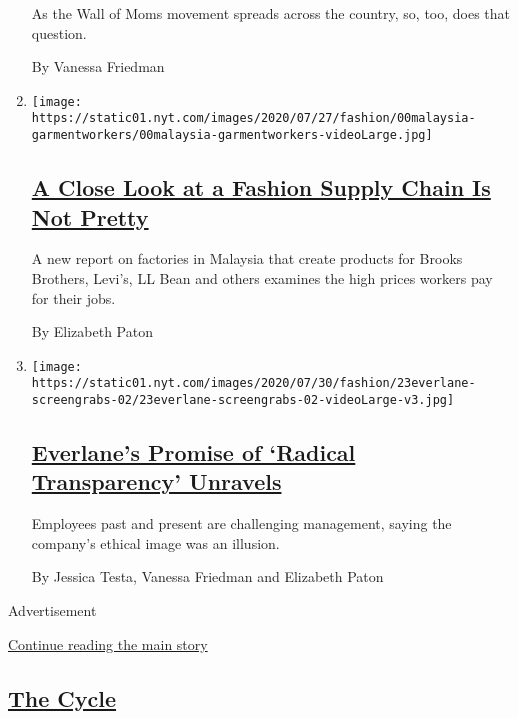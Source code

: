 \begin{enumerate}
  As the Wall of Moms movement spreads across the country, so, too, does
  that question.

  By Vanessa Friedman
\item
  \texttt{[image: https://static01.nyt.com/images/2020/07/27/fashion/00malaysia-garmentworkers/00malaysia-garmentworkers-videoLarge.jpg]}

  \hypertarget{a-close-look-at-a-fashion-supply-chain-is-not-pretty}{%
  \subsection{\texorpdfstring{\href{/2020/07/28/style/malaysia-forced-labor-garment-workers.html}{A
  Close Look at a Fashion Supply Chain Is Not
  Pretty}}{A Close Look at a Fashion Supply Chain Is Not Pretty}}\label{a-close-look-at-a-fashion-supply-chain-is-not-pretty}}

  A new report on factories in Malaysia that create products for Brooks
  Brothers, Levi's, LL Bean and others examines the high prices workers
  pay for their jobs.

  By Elizabeth Paton
\item
  \texttt{[image: https://static01.nyt.com/images/2020/07/30/fashion/23everlane-screengrabs-02/23everlane-screengrabs-02-videoLarge-v3.jpg]}

  \hypertarget{everlanes-promise-of-radical-transparency-unravels}{%
  \subsection{\texorpdfstring{\href{/2020/07/26/fashion/everlane-employees-ethical-clothing.html}{Everlane's
  Promise of `Radical Transparency'
  Unravels}}{Everlane's Promise of `Radical Transparency' Unravels}}\label{everlanes-promise-of-radical-transparency-unravels}}

  Employees past and present are challenging management, saying the
  company's ethical image was an illusion.

  By Jessica Testa, Vanessa Friedman and Elizabeth Paton
\end{enumerate}

Advertisement

\protect\hyperlink{after-mid5}{Continue reading the main story}

\hypertarget{the-cycle}{%
\subsection{\texorpdfstring{\href{/column/the-cycle}{The
Cycle}}{The Cycle}}\label{the-cycle}}

